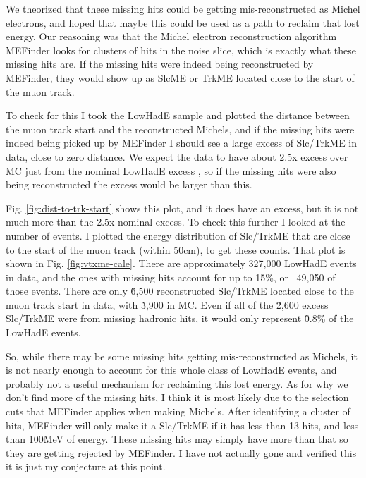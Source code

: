 \documentclass{article}
\begin{document}
We theorized that these missing hits could be getting mis-reconstructed as Michel electrons, and hoped that maybe this could be used as a path to reclaim that lost energy. Our reasoning was that the Michel electron reconstruction algorithm MEFinder looks for clusters of hits in the noise slice, which is exactly what these missing hits are. If the missing hits were indeed being reconstructed by MEFinder, they would show up as SlcME or TrkME located close to the start of the muon track. 

To check for this I took the LowHadE sample and plotted the distance between the muon track start and the reconstructed Michels, and if the missing hits were indeed being picked up by MEFinder I should see a large excess of Slc/TrkME in data, close to zero distance. We expect the data to have about 2.5x excess over MC just from the nominal LowHadE excess \cite{2026-05-11-lowhade-michels}, so if the missing hits were also being reconstructed the excess would be larger than this. 

Fig. \ref{fig:dist-to-trk-start} shows this plot, and it does have an excess, but it is not much more than the 2.5x nominal excess. To check this further I looked at the number of events. I plotted the energy distribution of Slc/TrkME that are close to the start of the muon track (within 50cm), to get these counts. That plot is shown in Fig. \ref{fig:vtxme-cale}. There are approximately 327,000 LowHadE events in data, and the ones with missing hits account for up to 15\%, or ~49,050 of those events. There are only \~6,500 reconstructed Slc/TrkME located close to the muon track start in data, with \~3,900 in MC. Even if all of the \~2,600 excess Slc/TrkME were from missing hadronic hits, it would only represent \~0.8\% of the LowHadE events. 

So, while there may be some missing hits getting mis-reconstructed as Michels, it is not nearly enough to account for this whole class of LowHadE events, and probably not a useful mechanism for reclaiming this lost energy. As for why we don't find more of the missing hits, I think it is most likely due to the selection cuts that MEFinder applies when making Michels. After identifying a cluster of hits, MEFinder will only make it a Slc/TrkME if it has less than 13 hits, and less than 100MeV of energy. These missing hits may simply have more than that so they are getting rejected by MEFinder. I have not actually gone and verified this it is just my conjecture at this point. 
\end{document}
